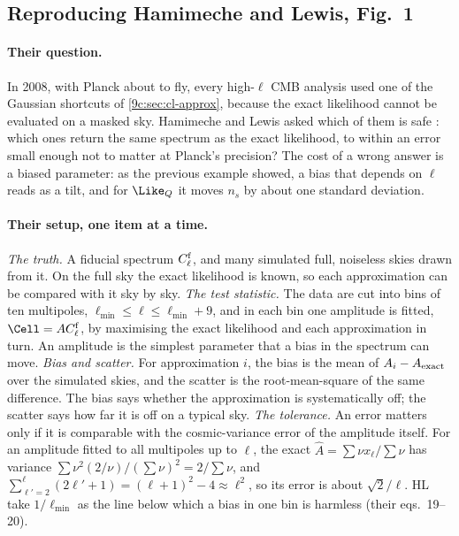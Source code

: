 \subsection{Reproducing Hamimeche and Lewis, Fig.~1}
\label{9c:sec:hl}

\paragraph{Their question.} In 2008, with Planck about to fly, every high-$\ell$ CMB analysis used one of the
Gaussian shortcuts of \cref{9c:sec:cl-approx}, because the exact likelihood cannot be evaluated on a masked
sky. Hamimeche and Lewis asked which of them is safe \cite{HamimecheLewis2008}: which ones return the same
spectrum as the exact likelihood, to within an error small enough not to matter at Planck's precision? The
cost of a wrong answer is a biased parameter: as the previous example showed, a bias that depends on $\ell$
reads as a tilt, and for $\Like_Q$ it moves $n_s$ by about one standard deviation.

\paragraph{Their setup, one item at a time.}
\emph{The truth.} A fiducial spectrum $C^{\rm f}_\ell$, and many simulated full, noiseless skies drawn from it.
On the full sky the exact likelihood is known, so each approximation can be compared with it sky by sky.
\emph{The test statistic.} The data are cut into bins of ten multipoles, $\ell_{\min}\le\ell\le\ell_{\min}+9$, and in
each bin one amplitude is fitted, $\Cell=AC^{\rm f}_\ell$, by maximising the exact likelihood and each
approximation in turn. An amplitude is the simplest parameter that a bias in the spectrum can move.
\emph{Bias and scatter.} For approximation $i$, the bias is the mean of $A_i-A_{\rm exact}$ over the simulated
skies, and the scatter is the root-mean-square of the same difference. The bias says whether the
approximation is systematically off; the scatter says how far it is off on a typical sky.
\emph{The tolerance.} An error matters only if it is comparable with the cosmic-variance error of the
amplitude itself. For an amplitude fitted to all multipoles up to $\ell$, the exact $\hat A=\sum\nu x_\ell/\sum\nu$
has variance $\sum\nu^2(2/\nu)/(\sum\nu)^2=2/\sum\nu$, and $\sum_{\ell'=2}^{\ell}(2\ell'+1)=(\ell+1)^2-4\approx\ell^2$, so
its error is about $\sqrt2/\ell$. HL take $1/\ell_{\min}$ as the line below which a bias in one bin is harmless
(their eqs.~19--20).

